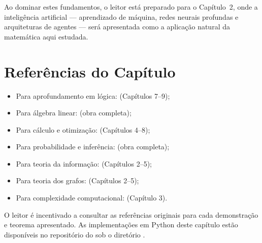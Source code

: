 Ao dominar estes fundamentos, o leitor está preparado para o Capítulo~2,
onde a inteligência artificial --- aprendizado de máquina, redes neurais
profundas e arquiteturas de agentes --- será apresentada como a aplicação
natural da matemática aqui estudada.

\section*{Referências do Capítulo}

\begin{itemize}
    \item Para aprofundamento em lógica: \cite{russell2020inteligencia}
          (Capítulos 7--9);
    \item Para álgebra linear: \cite{strang2016algebra}
          (obra completa);
    \item Para cálculo e otimização: \cite{goodfellow2016deep}
          (Capítulos 4--8);
    \item Para probabilidade e inferência: \cite{wasserman2004all}
          (obra completa);
    \item Para teoria da informação: \cite{cover2006elements}
          (Capítulos 2--5);
    \item Para teoria dos grafos: \cite{barabasi2016network}
          (Capítulos 2--5);
    \item Para complexidade computacional: \cite{russell2020inteligencia}
          (Capítulo 3).
\end{itemize}

\begin{observacao}
    O leitor é incentivado a consultar as referências originais para cada
    demonstração e teorema apresentado. As implementações em Python deste
    capítulo estão disponíveis no repositório do \opencodeeco{} sob o
    diretório .
\end{observacao}


